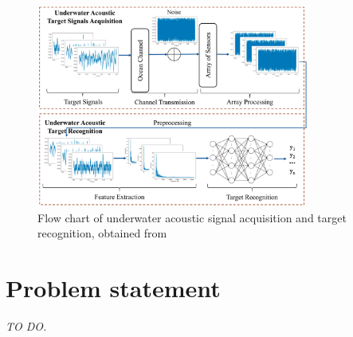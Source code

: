 \begin{figure}[htbp]
\centering 
\includegraphics[width=0.8\textwidth]{img/ch1/flowchart.png} 
\caption{Flow chart of underwater acoustic signal acquisition and target recognition, obtained from \cite[Fig.~1]{luo_survey_2023}} 
\label{fig:luo-flowchart} 
\end{figure}

\section{Problem statement}

\textit{TO DO.}



